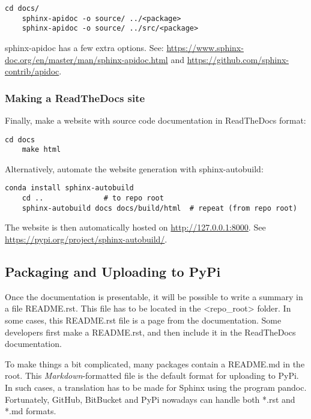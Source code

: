\begin{lstlisting}[style=DOS]
    cd docs/
    sphinx-apidoc -o source/ ../<package>
    sphinx-apidoc -o source/ ../src/<package>
\end{lstlisting}

\textsf{sphinx-apidoc} has a few extra options. See: \url{https://www.sphinx-doc.org/en/master/man/sphinx-apidoc.html} and \url{https://github.com/sphinx-contrib/apidoc}. \\

\subsubsection{Making a ReadTheDocs site}
Finally, make a website with source code documentation in ReadTheDocs format:

\begin{lstlisting}[style=DOS]
	cd docs
	make html
\end{lstlisting}

Alternatively, automate the website generation with \textsf{sphinx-autobuild}:

\begin{lstlisting}[style=DOS]
	conda install sphinx-autobuild
	cd ..              # to repo root
	sphinx-autobuild docs docs/build/html  # repeat (from repo root)
\end{lstlisting}

The website is then automatically hosted on \url{ http://127.0.0.1:8000}. See \url{https://pypi.org/project/sphinx-autobuild/}. 

\subsection{Packaging and Uploading to PyPi}

Once the documentation is presentable, it will be possible to write a summary in a file \textsf{README.rst}. This file has to be located in the \textsf{<repo\_root>} folder. In some cases, this README.rst file is a page from the documentation. Some developers first make a README.rst, and then include it in the ReadTheDocs documentation.

To make things a bit complicated, many packages contain a \textsf{README.md} in the root. This \textit{Markdown}-formatted file is the default format for uploading to PyPi. In such cases, a translation has to be made for Sphinx using the program \textsf{pandoc}. Fortunately, GitHub, BitBucket and PyPi nowadays can handle both *.rst and *.md formats.

